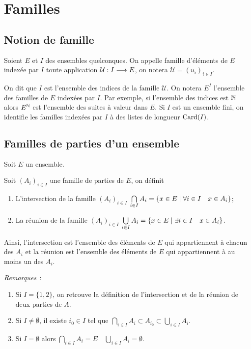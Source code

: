 \section{Familles}\label{chap3-sec:familles}

\subsection{Notion de famille}\label{chap3-subsec:notionfamille}
\begin{defdef}
  Soient \(E\) et \(I\) des ensembles quelconques. On appelle famille
  d'éléments de \(E\) indexée par \(I\) toute application
  \(\mathcal{U}:I \longrightarrow{} E\), on notera \(\mathcal{U}={(u_i)}_{i\in{}I}\).
\end{defdef}

On dit que \(I\) est l'ensemble des indices de la famille \(\mathcal{U}\). On
notera \(E^I\) l'ensemble des familles de \(E\) indexées par \(I\). Par exemple,
si l'ensemble des indices est \(\mathbb{N}\) alors \(E^{\mathbb{N}}\) est l'ensemble des suites
à valeur dans \(E\). Si \(I\) est un ensemble fini, on identifie les familles
indexées par \(I\) à des listes de longueur \(\operatorname{Card}(I)\).

\subsection{Familles de parties d'un ensemble}\label{chap3-subsec:familledeparties}

Soit \(E\) un ensemble.
\begin{defdef}
  Soit \({(A_i)}_{i \in{}I}\) une famille de parties de \(E\), on définit
  \begin{enumerate}
    \item L'intersection de la famille \({(A_i)}_{i \in{}I}\)
      \(\bigcap\limits_{i \in{}I} A_i = \left\{x \in{}E\mathrel{}\middle|\mathrel{}\forall{}i \in{}I
      \quad x \in{}A_i\right\}\);
    \item La réunion de la famille \({(A_i)}_{i \in{}I}\)  \(\bigcup\limits_{i
      \in{}I} A_i = \left\{x \in{}E\mathrel{}\middle|\mathrel{}\exists{}i \in{}I \quad x \in{}A_i\right\}\).
  \end{enumerate}
\end{defdef}

Ainsi, l'intersection est l'ensemble des éléments de \(E\) qui appartiennent à
chacun des \(A_i\) et la réunion est l'ensemble des éléments de \(E\) qui
appartiennent à au moins un des \(A_i\).

\emph{Remarques}~:
\begin{enumerate}
  \item Si \(I = \{1,2\}\), on retrouve la définition de l'intersection et de la
    réunion de deux parties de \(A\).
  \item Si \(I \neq{}\emptyset\), il existe \(i_0 \in{}I\) tel que
    \(\bigcap\limits_{i \in{}I} A_i \subset{}A_{i_0} \subset{}\bigcup\limits_{i
    \in{}I} A_i\).
  \item Si \(I = \emptyset\) alors \(\bigcap\limits_{i \in{}I} A_i  = E \quad
    \bigcup\limits_{i \in{}I} A_i = \emptyset\).
\end{enumerate}

